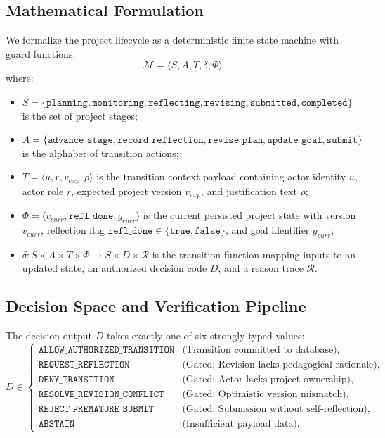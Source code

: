 \documentclass[11pt,a4paper]{article}
\begin{document}
\subsection{Mathematical Formulation}
We formalize the project lifecycle as a deterministic finite state machine with guard functions:
\begin{equation}
\mathcal{M} = \langle S, A, T, \delta, \Phi \rangle
\end{equation}
where:
\begin{itemize}
    \item $S = \{\mathtt{planning}, \mathtt{monitoring}, \mathtt{reflecting}, \mathtt{revising}, \mathtt{submitted}, \mathtt{completed}\}$ is the set of project stages;
    \item $A = \{\mathtt{advance\_stage}, \mathtt{record\_reflection}, \mathtt{revise\_plan}, \mathtt{update\_goal}, \mathtt{submit}\}$ is the alphabet of transition actions;
    \item $T = \langle u, r, v_{exp}, \rho \rangle$ is the transition context payload containing actor identity $u$, actor role $r$, expected project version $v_{exp}$, and justification text $\rho$;
    \item $\Phi = \langle v_{curr}, \mathtt{refl\_done}, g_{curr} \rangle$ is the current persisted project state with version $v_{curr}$, reflection flag $\mathtt{refl\_done} \in \{\mathtt{true}, \mathtt{false}\}$, and goal identifier $g_{curr}$;
    \item $\delta: S \times A \times T \times \Phi \to S \times D \times \mathcal{R}$ is the transition function mapping inputs to an updated state, an authorized decision code $D$, and a reason trace $\mathcal{R}$.
\end{itemize}

\subsection{Decision Space and Verification Pipeline}
The decision output $D$ takes exactly one of six strongly-typed values:
\begin{equation}
D \in \left\{
\begin{array}{ll}
\mathtt{ALLOW\_AUTHORIZED\_TRANSITION} & \text{(Transition committed to database)}, \\
\mathtt{REQUEST\_REFLECTION} & \text{(Gated: Revision lacks pedagogical rationale)}, \\
\mathtt{DENY\_TRANSITION} & \text{(Gated: Actor lacks project ownership)}, \\
\mathtt{RESOLVE\_REVISION\_CONFLICT} & \text{(Gated: Optimistic version mismatch)}, \\
\mathtt{REJECT\_PREMATURE\_SUBMIT} & \text{(Gated: Submission without self-reflection)}, \\
\mathtt{ABSTAIN} & \text{(Insufficient payload data)}.
\end{array}
\right.
\end{equation}
\end{document}
